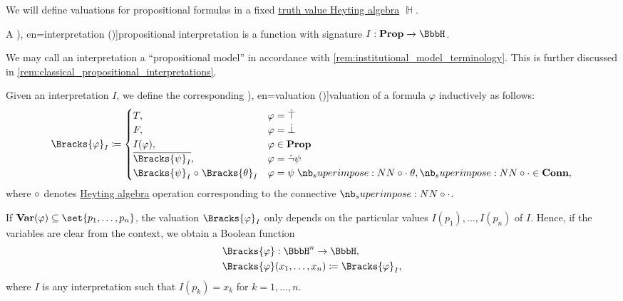 \begin{definition}\label{def:propositional_valuation}\mimprovised
  We will define valuations for propositional formulas in a fixed \hyperref[con:truth_value_algebra]{truth value Heyting algebra} \( \BbbH \).

  \begin{thmenum}
     A \term[ru=интерпретация (\cite[17]{Герасимов2011Вычислимость}), en=interpretation (\cite[10]{Smullyan1995FOL})]{propositional interpretation} is a function with signature \( I: \op*{Prop} \to \BbbH \).

    We may call an interpretation a \enquote{propositional model} in accordance with \cref{rem:institutional_model_terminology}. This is further discussed in \cref{rem:classical_propositional_interpretations}.

     Given an interpretation \( I \), we define the corresponding \term[ru=значение истинности (формулы) (\cite[8]{Эдельман1975Логика}), en=valuation (\cite[10]{Smullyan1995FOL})]{valuation} of a formula \( \varphi \) inductively as follows:
    \begin{equation}\label{eq:def:propositional_valuation/formula_valuation}
      \Bracks{\varphi}_I \coloneqq \begin{cases}
        T,                                         &\varphi = \syntop \\
        F,                                         &\varphi = \synbot \\
        I(\varphi),                                &\varphi \in \op*{Prop} \\
        \oline{\Bracks{\psi}_I},                   &\varphi = \synneg \psi \\
        \Bracks{\psi}_I \relcirc \Bracks{\theta}_I &\varphi = \psi \syncirc \theta, {\syncirc} \in \op*{Conn},
      \end{cases}
    \end{equation}
    where \( \relcirc \) denotes \hyperref[def:heyting_algebra]{Heyting algebra} operation corresponding to the connective \( \syncirc \).

     If \( \op*{Var}(\varphi) \subseteq \set{ p_1, \ldots, p_n } \), the valuation \( \Bracks{\varphi}_I \) only depends on the particular values \( I(p_1), \ldots, I(p_n) \) of \( I \). Hence, if the variables are clear from the context, we obtain a Boolean function
    \begin{equation*}
      \begin{aligned}
        &\Bracks{\varphi}: \BbbH^n \to \BbbH, \\
        &\Bracks{\varphi}(x_1, \ldots, x_n) \coloneqq \Bracks{\varphi}_I,
      \end{aligned}
    \end{equation*}
    where \( I \) is any interpretation such that \( I(p_k) = x_k \) for \( k = 1, \ldots, n \).


\end{thmenum}
\end{definition}
